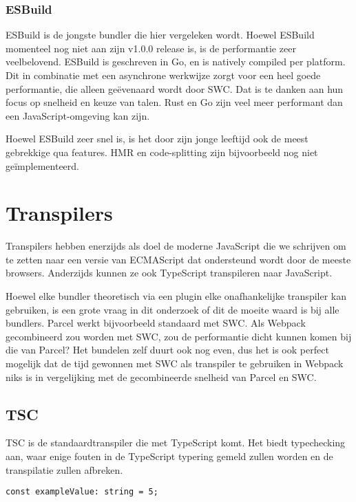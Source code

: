 \subsubsection{ESBuild}

ESBuild is de jongste bundler die hier vergeleken wordt. Hoewel ESBuild momenteel nog niet aan zijn v1.0.0 release is, is de performantie zeer veelbelovend. ESBuild is geschreven in Go, en is natively compiled per platform. Dit in combinatie met een asynchrone werkwijze zorgt voor een heel goede performantie, die alleen geëvenaard wordt door SWC. Dat is te danken aan hun focus op snelheid en keuze van talen. Rust en Go zijn veel meer performant dan een JavaScript-omgeving kan zijn. \autocite{eaton_2021}

Hoewel ESBuild zeer snel is, is het door zijn jonge leeftijd ook de meest gebrekkige qua features. HMR en code-splitting zijn bijvoorbeeld nog niet geïmplementeerd. \autocite{wallace}

\section{Transpilers}

Transpilers hebben enerzijds als doel de moderne JavaScript die we schrijven om te zetten naar een versie van ECMAScript dat ondersteund wordt door de meeste browsers. Anderzijds kunnen ze ook TypeScript transpileren naar JavaScript. 

Hoewel elke bundler theoretisch via een plugin elke onafhankelijke transpiler kan gebruiken, is een grote vraag in dit onderzoek of dit de moeite waard is bij alle bundlers. Parcel werkt bijvoorbeeld standaard met SWC. Als Webpack gecombineerd zou worden met SWC, zou de performantie dicht kunnen komen bij die van Parcel? Het bundelen zelf duurt ook nog even, dus het is ook perfect mogelijk dat de tijd gewonnen met SWC als transpiler te gebruiken in Webpack niks is in vergelijking met de gecombineerde snelheid van Parcel en SWC.

\subsection{TSC}

TSC is de standaardtranspiler die met TypeScript komt. Het biedt typechecking aan, waar enige fouten in de TypeScript typering gemeld zullen worden en de transpilatie zullen afbreken.

\begin{lstlisting}
const exampleValue: string = 5;
\end{lstlisting}

